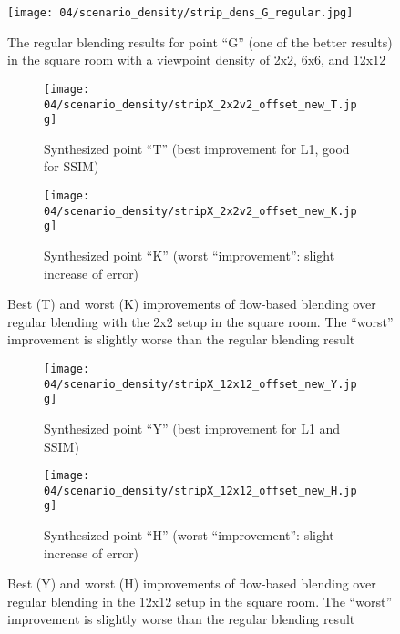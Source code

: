 \begin{figure}
		\centering
    \texttt{[image: 04/scenario\_density/strip\_dens\_G\_regular.jpg]}
		\caption{The regular blending results for point ``G'' (one of the better results) in the square room with a viewpoint density of 2x2, 6x6, and 12x12}
		\label{fig:density_regular_G}
\end{figure}

\begin{figure}
\centering
    \hfill
    \begin{subfigure}[b]{\textwidth}
            \centering
            \texttt{[image: 04/scenario\_density/stripX\_2x2v2\_offset\_new\_T.jpg]}
            \caption{Synthesized point ``T'' (best improvement for L1, good for SSIM)}
    \end{subfigure}
    \hfill

    \hfill
    \begin{subfigure}[b]{\textwidth}
            \centering
            \texttt{[image: 04/scenario\_density/stripX\_2x2v2\_offset\_new\_K.jpg]}
            \caption{Synthesized point ``K'' (worst ``improvement'': slight increase of error)}
    \end{subfigure}
    \hfill
  \caption[Best and worst improvements of flow-based blending over regular blending in the 2x2 setup]{Best (T) and worst (K) improvements of flow-based blending over regular blending with the 2x2 setup in the square room. The ``worst'' improvement is slightly worse than the regular blending result} \label{fig:density_2x2_best_worst}
\end{figure}

\begin{figure}
\centering
    \hfill
    \begin{subfigure}[b]{\textwidth}
            \centering
            \texttt{[image: 04/scenario\_density/stripX\_12x12\_offset\_new\_Y.jpg]}
            \caption{Synthesized point ``Y'' (best improvement for L1 and SSIM)}
    \end{subfigure}
    \hfill

    \hfill
    \begin{subfigure}[b]{\textwidth}
            \centering
            \texttt{[image: 04/scenario\_density/stripX\_12x12\_offset\_new\_H.jpg]}
            \caption{Synthesized point ``H'' (worst ``improvement'': slight increase of error)}
    \end{subfigure}
    \hfill
  \caption[Best and worst improvements of flow-based blending over regular blending with the 12x12 setup]{Best (Y) and worst (H) improvements of flow-based blending over regular blending in the 12x12 setup in the square room. The ``worst'' improvement is slightly worse than the regular blending result} \label{fig:density_12x12_best_worst}
\end{figure}
